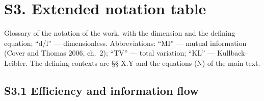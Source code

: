 \documentclass[pdflatex,sn-mathphys-ay]{sn-jnl}
\begin{document}
\section*{S3. Extended notation table}\label{s3.-extended-notation-table}



Glossary of the notation of the work, with the dimension and the defining equation; ``d/l'' --- dimensionless. Abbreviations: ``MI'' --- mutual information (Cover and Thomas 2006, ch.~2); ``TV'' --- total variation; ``KL'' --- Kullback--Leibler. The defining contexts are §§ X.Y and the equations (N) of the main text.



\subsection*{S3.1 Efficiency and information flow}\label{s3.1-efficiency-and-information-flow}
\end{document}

